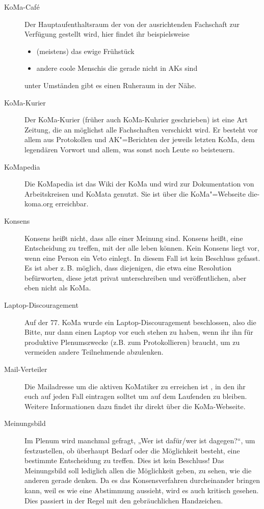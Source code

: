 \begin{description}
\item[KoMa-Caf\'{e}]
    Der Hauptaufenthaltsraum der von der ausrichtenden Fachschaft zur Verfügung gestellt wird, hier findet ihr beispielsweise
    \begin{itemize}
        \item (meistens) das ewige Frühstück
        \item andere coole Menschis die gerade nicht in AKs sind
    \end{itemize}
    unter Umständen gibt es einen Ruheraum in der Nähe.

\item[KoMa-Kurier]
    Der KoMa-Kurier (früher auch KoMa-Kuhrier geschrieben) ist eine Art Zeitung, die an möglichst alle Fachschaften verschickt wird. Er besteht vor allem aus Protokollen und AK"=Berichten der jeweils letzten KoMa, dem legendären Vorwort und allem, was sonst noch Leute so beisteuern.

\item[KoMapedia]
    Die KoMapedia ist das Wiki der KoMa und wird zur Dokumentation von Arbeitskreisen und KoMata genutzt. Sie ist über die KoMa"=Webseite	die-koma.org erreichbar.

\item[Konsens]
    Konsens heißt nicht, dass alle einer Meinung sind. Konsens heißt, eine Entscheidung zu treffen, mit der alle leben können. Kein Konsens liegt vor, wenn eine Person ein Veto einlegt. In diesem Fall ist kein Beschluss gefasst.  Es ist aber z.\,B. möglich, dass diejenigen, die etwa eine Resolution befürworten, diese jetzt privat unterschreiben und veröffentlichen, aber eben nicht als KoMa.

\item[Laptop-Discouragement]\label{Laptop-Discouragement}
    Auf der 77. KoMa wurde ein Laptop-Discouragement beschlossen, also die Bitte,     nur dann einen Laptop vor euch stehen zu haben, wenn ihr ihn für produktive Plenumszwecke (z.B. zum       Protokollieren) braucht, um zu vermeiden andere Teilnehmende abzulenken.

\item[Mail-Verteiler]
    Die Mailadresse um die aktiven KoMatiker zu erreichen ist , in den ihr euch auf jeden Fall eintragen solltet um auf dem Laufenden zu bleiben. Weitere Informationen dazu findet ihr direkt über die KoMa-Webseite.

\item[Meinungsbild]
    Im Plenum wird manchmal gefragt, „Wer ist dafür/wer ist dagegen?“, um festzustellen, ob überhaupt Bedarf oder die Möglichkeit besteht, eine bestimmte Entscheidung zu treffen. Dies ist kein Beschluss! Das Meinungsbild soll lediglich allen die Möglichkeit geben, zu sehen, wie die anderen gerade denken. Da es das Konsensverfahren durcheinander bringen kann, weil es wie eine Abstimmung aussieht, wird es auch kritisch gesehen. Dies passiert in der Regel mit den gebräuchlichen Handzeichen.


\end{description}
